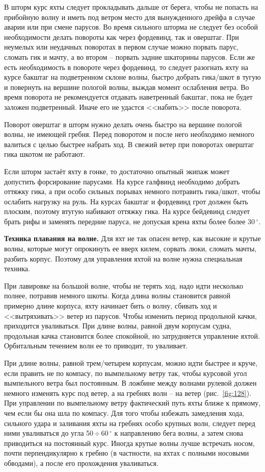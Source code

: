 \documentclass[a4paper, 12pt, twoside, final, book, russian, fittopage, cyremdash]{ncc}
\newcommand{\gr}{\ensuremath{\,^\circ}\xspace}
\newcommand{\otdo}{\,\ensuremath{\div}\,}
\newcommand{\ris}[1]{\ref{fig:#1}}
\begin{document}
В шторм курс яхты следует прокладывать дальше от берега, чтобы не попасть на прибойную волну и иметь под ветром место для вынужденного дрейфа в случае аварии или при смене парусов. Во время сильного шторма не следует без особой необходимости делать повороты как через фордевинд, так и оверштаг. При неумелых или неудачных поворотах в первом случае можно порвать парус, сломать гик и мачту, а во втором \--- порвать задние шкаторины парусов. Если же есть необходимость в повороте через фордевинд, то следует разогнать яхту на курсе бакштаг на подветренном склоне волны, быстро добрать гика\-/шкот в тугую и повернуть на вершине пологой волны, выждав момент ослабления ветра. Во время поворота не рекомендуется отдавать наветренный бакштаг, пока не будет заложен подветренный. Иначе его не удастся <<набить>> после поворота.

Поворот оверштаг в шторм нужно делать очень быстро на вершине пологой волны, не имеющей гребня. Перед поворотом и после него необходимо немного валиться с целью быстрее набрать ход. В свежий ветер при поворотах оверштаг гика шкотом не работают.

Если шторм застаёт яхту в гонке, то достаточно опытный экипаж может допустить форсирование парусами. На курсе галфвинд необходимо добрать оттяжку гика, а при особо сильных порывах немного потравить гика\-/шкот, чтобы ослабить нагрузку на руль. На курсах бакштаг и фордевинд грот должен быть плоским, поэтому втугую набивают оттяжку гика. На курсе бейдевинд следует брать рифы и заменять передние паруса, не допуская крена яхты более более 30\gr.
 
\textbf{Техника плавания на волне.} Для яхт не так опасен ветер, как высокие и крутые волны, которые могут опрокинуть ее вверх килем, сорвать люки, сломать мачты, разбить корпус. Поэтому для управления яхтой на волне нужна специальная техника.

При лавировке на большой волне, чтобы не терять ход, надо идти несколько полнее, потравив немного шкоты. Когда длина волны становится равной примерно длине корпуса, яхту начинает бить о волну, сбивать ход и <<вытряхивать>> ветер из парусов. Чтобы изменить период продольной качки, приходится уваливаться. При длине волны, равной двум корпусам судна, продольная качка становится более спокойной, но затрудняется управление яхтой. Орбитальным течением волн ее то приводит, то уваливает.

При длине волны, равной трем\-/четырем корпусам, можно идти быстрее и круче, если править не по компасу, по вымпельному ветру так, чтобы курсовой угол вымпельного ветра был постоянным. В ложбине между волнами рулевой должен немного изменять курс под ветер, а на гребнях волн \--- на ветер (рис.~\ris{128}). При управлении по вымпельному ветру фактический путь яхты ближе к прямому, чем если бы она шла по компасу. Для того чтобы избежать замедления хода, сильного удара и заливания яхты на гребнях особо крупных волн, следует перед ними уваливаться до угла 50\otdo 60\gr к направлению бега волны, а затем снова приводиться на постоянный курс. Иногда крутые волны лучше встречать носом, почти перпендикулярно к гребню (в частности, на яхтах с полными носовыми обводами), а после его прохождения уваливаться.
\end{document}

